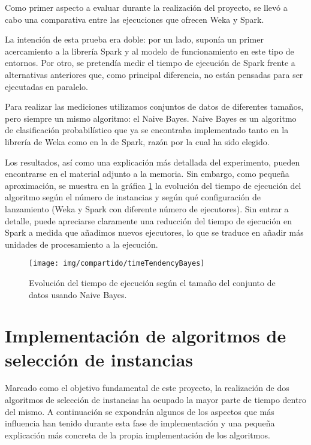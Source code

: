 Como primer aspecto a evaluar durante la realización del proyecto, se llevó a cabo una comparativa entre las ejecuciones que ofrecen Weka y Spark.

La intención de esta prueba era doble: por un lado, suponía un primer acercamiento a la librería Spark y al modelo de funcionamiento en este tipo de entornos. Por otro, se pretendía medir el tiempo de ejecución de Spark frente a alternativas anteriores que, como principal diferencia, no están pensadas para ser ejecutadas en paralelo.

Para realizar las mediciones utilizamos conjuntos de datos de diferentes tamaños, pero siempre un mismo algoritmo: el Naive Bayes. Naive Bayes es un algoritmo de clasificación probabilístico que ya se encontraba implementado tanto en la librería de Weka \cite{John1995} como en la de Spark, razón por la cual ha sido elegido.

Los resultados, así como una explicación más detallada del experimento, pueden encontrarse en el material adjunto a la memoria. Sin embargo, como pequeña aproximación, se muestra en la gráfica \ref{fig:img/compartido/timeTendencyBayes} la evolución del tiempo de ejecución del algoritmo según el número de instancias y según qué configuración de lanzamiento (Weka y Spark con diferente número de ejecutores). Sin entrar a detalle, puede apreciarse claramente una reducción del tiempo de ejecución en Spark a medida que añadimos nuevos ejecutores, lo que se traduce en añadir más unidades de procesamiento a la ejecución. 

	\begin{figure}[!h]
		\centering
		\texttt{[image: img/compartido/timeTendencyBayes]}
		\caption{Evolución del tiempo de ejecución según el tamaño del conjunto de datos usando Naive Bayes.}\label{fig:img/compartido/timeTendencyBayes}
	\end{figure}

\section{Implementación de algoritmos de selección de instancias}

Marcado como el objetivo fundamental de este proyecto, la realización de dos algoritmos de selección de instancias ha ocupado la mayor parte de tiempo dentro del mismo. A continuación se expondrán algunos de los aspectos que más influencia han tenido durante esta fase de implementación y una pequeña explicación más concreta de la propia implementación de los algoritmos.


